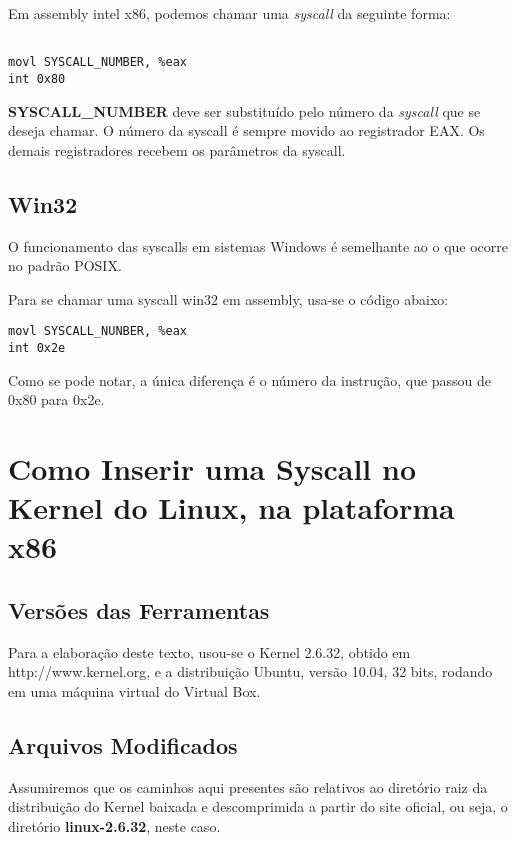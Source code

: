 \documentclass{article}
\begin{document}
Em assembly intel x86, podemos chamar uma \textit{syscall} da seguinte forma:

\begin{verbatim}

movl SYSCALL_NUMBER, %eax
int 0x80

\end{verbatim}

\textbf{SYSCALL\_NUMBER} deve ser substituído pelo número da \textit{syscall} que se deseja chamar. O número da syscall é sempre movido
ao registrador EAX. Os demais registradores recebem os parâmetros da syscall.



\subsection{Win32}

O funcionamento das syscalls em sistemas Windows é semelhante ao o que ocorre no padrão POSIX. 

Para se chamar uma syscall win32 em assembly, usa-se o código abaixo:

\begin{verbatim}
movl SYSCALL_NUNBER, %eax
int 0x2e
\end{verbatim}

Como se pode notar, a única diferença é o número da instrução, que passou de 0x80 para 0x2e.




\section{Como Inserir uma Syscall no Kernel do Linux, na plataforma x86}


\subsection{Versões das Ferramentas}

Para a elaboração deste texto, usou-se o Kernel 2.6.32, obtido em http://www.kernel.org, e
a distribuição Ubuntu, versão 10.04, 32 bits, rodando em uma máquina virtual do Virtual Box.


\subsection{Arquivos Modificados}

Assumiremos que os caminhos aqui presentes são relativos ao diretório raiz da distribuição do Kernel baixada e descomprimida
a partir do site oficial, ou seja, o diretório \textbf{linux-2.6.32}, neste caso.
\end{document}

